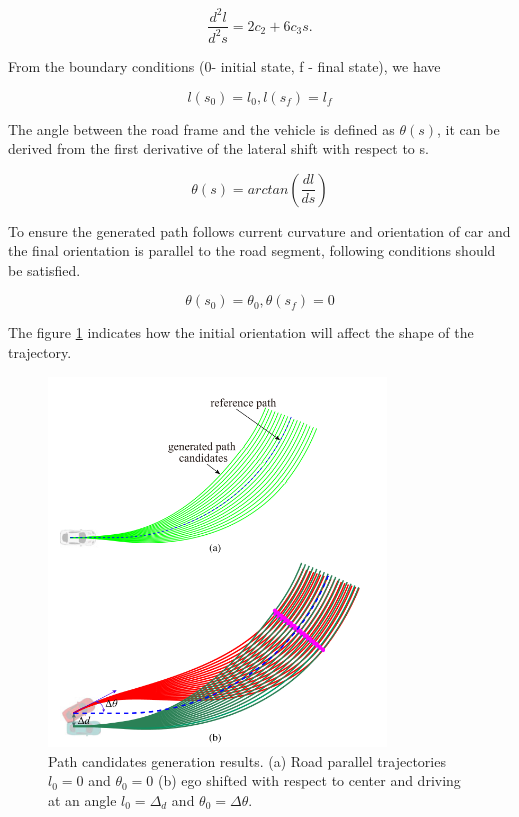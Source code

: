 \begin{equation}
    \frac{d^2l}{d^2s} = 2c_2 + 6c_3s.
\label{lat_acc}    
\end{equation}

From the boundary conditions (0- initial state, f - final state), we have

\begin{equation}
l(s_0) = l_0 , l(s_f ) = l_f
\label{lat_boudary}
\end{equation}

The angle between the road frame and the vehicle is defined as $\theta(s)$, it can be derived from the first derivative of the lateral shift with respect to s. 

\begin{equation}
\theta(s) = arctan(\frac{dl}{ds})
\label{lat_veh_theta}
\end{equation}

To ensure the generated path follows current curvature and orientation of car and the final orientation is parallel to the road segment, following conditions should be satisfied.


\begin{equation}
\theta(s_0) = \theta_0 , \theta(s_f) = 0
\label{th_bundary}
\end{equation}

The figure \ref{lat_planning} indicates how the initial orientation will affect the shape of the trajectory. 

 \begin{figure}
    \centering
    \includegraphics[width=0.8\textwidth]{Images/lateral_planning.png}
    \caption{Path candidates generation results. (a) Road parallel trajectories $l_0 = 0$ and $\theta_0 = 0$ (b) ego shifted with respect to center and driving at an angle $ 
l_0 = \Delta_d$ and $ \theta_0 = \Delta\theta$. \cite{real_time_traj_plan_article}}
    \label{lat_planning}
\end{figure}



